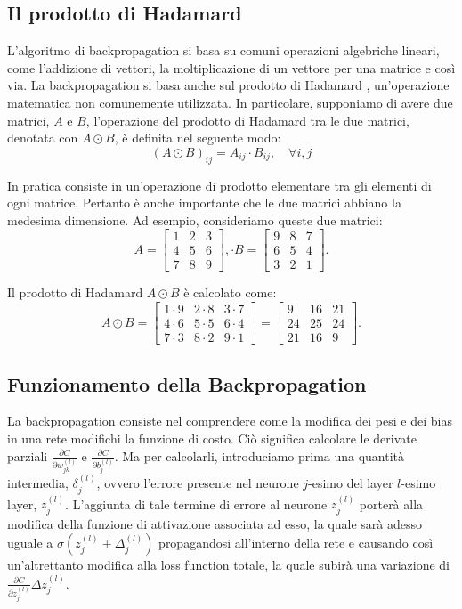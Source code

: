 \subsection{Il prodotto di Hadamard}
L'algoritmo di backpropagation si basa su comuni operazioni algebriche lineari, 
come l'addizione di vettori, la moltiplicazione di un vettore per una matrice e così via. 
La backpropagation si basa anche sul prodotto di Hadamard \cite{prodotto_Hadamard}, 
un'operazione matematica non 
comunemente utilizzata.
In particolare, supponiamo di avere due matrici, $A$ e $B$, l'operazione del prodotto di Hadamard
tra le due matrici, denotata con $A \odot B$, è definita nel seguente modo:
\begin{equation}
    (A \odot B)_{ij} = A_{ij} \cdot B_{ij}, \quad \forall i,j
\end{equation}

In pratica consiste in un'operazione di prodotto elementare tra gli elementi di ogni matrice. 
Pertanto è anche importante che le due matrici abbiano la medesima dimensione.
Ad esempio, consideriamo queste due matrici:
\[
A = \begin{bmatrix}
1 & 2 & 3 \\
4 & 5 & 6 \\
7 & 8 & 9
\end{bmatrix}, \cdot
B = \begin{bmatrix}
9 & 8 & 7 \\
6 & 5 & 4 \\
3 & 2 & 1
\end{bmatrix}.
\]

Il prodotto di Hadamard \( A \odot B \) è calcolato come:
\[
A \odot B = \begin{bmatrix}
1 \cdot 9 & 2 \cdot 8 & 3 \cdot 7 \\
4 \cdot 6 & 5 \cdot 5 & 6 \cdot 4 \\
7 \cdot 3 & 8 \cdot 2 & 9 \cdot 1
\end{bmatrix}
= \begin{bmatrix}
9 & 16 & 21 \\
24 & 25 & 24 \\
21 & 16 & 9
\end{bmatrix}.
\]

\subsection{Funzionamento della Backpropagation}
La backpropagation consiste nel comprendere come la modifica dei pesi e dei bias in una rete 
modifichi la funzione di costo. 
Ciò significa calcolare le derivate parziali $\frac{\partial C}{\partial w^{(l)}_{jk}}$ e 
$\frac{\partial C}{\partial b^{(l)}_{j}}$. Ma per calcolarli, introduciamo prima una quantità 
intermedia, $\delta_{j}^{(l)}$, ovvero l’errore presente nel neurone $j$-esimo del layer $l$-esimo
layer, $z_{j}^{(l)}$.
L’aggiunta di tale termine di errore al neurone $z_{j}^{(l)}$ porterà alla modifica 
della funzione di attivazione associata 
ad esso, la quale sarà adesso uguale a $\sigma (z_{j}^{(l)} + \Delta_{j}^{(l)})$
propagandosi all’interno della
 rete e causando così un’altrettanto modifica alla loss function totale, la quale subirà
 una variazione di $\frac{\partial C}{\partial z_{j}^{(l)}}\Delta z_{j}^{(l)}$.

